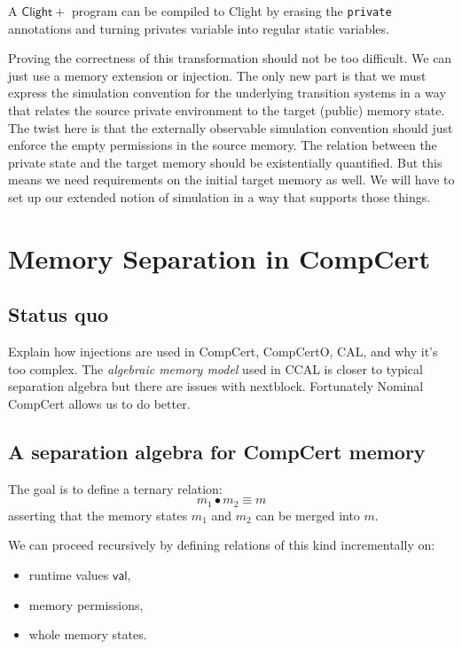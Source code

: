 \documentclass[acmsmall,screen,review,anonymous]{acmart}
\newcommand{\ClightP}{\ensuremath{\mathsf{Clight+}}}
\begin{document}
A \ClightP{} program can be compiled to Clight
by erasing the \texttt{private} annotations
and turning privates variable into regular
static variables.

Proving the correctness of this transformation
should not be too difficult.
We can just use a memory extension or injection.
The only new part is that we must express
the simulation convention for the underlying transition systems
in a way that relates the source private environment
to the target (public) memory state.
The twist here is that
the externally observable simulation convention
should just enforce the empty permissions in the source memory.
The relation between the private state and the target memory
should be existentially quantified.
But this means we need requirements on the initial target memory as well.
We will have to set up our extended notion of simulation
in a way that supports those things.

\section{Memory Separation in CompCert}

\subsection{Status quo}

Explain how injections are used in CompCert, CompCertO, CAL,
and why it's too complex.
The \emph{algebraic memory model} used in CCAL
is closer to typical separation algebra
but there are issues with nextblock.
Fortunately Nominal CompCert allows us to
do better.

\subsection{A separation algebra for CompCert memory}

The goal is to define a ternary relation:
\[
    m_1 \bullet m_2 \equiv m
\]
asserting that the memory states $m_1$ and $m_2$
can be merged into $m$.

We can proceed recursively by defining
relations of this kind incrementally on:
\begin{itemize}
  \item runtime values $\mathsf{val}$,
  \item memory permissions,
  \item whole memory states.
\end{itemize}
\end{document}
